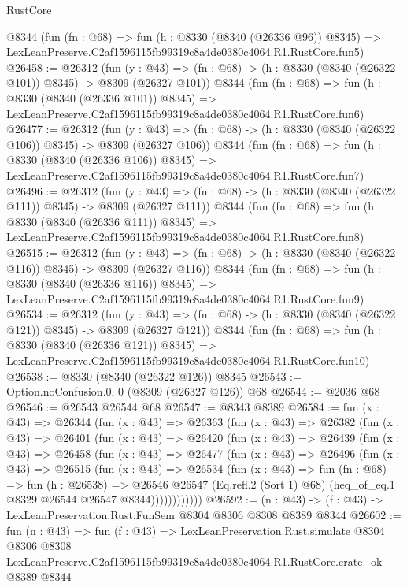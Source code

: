 \begin{lexlean}{RustCore}
\begin{coremodule}
    @8344
    (fun (fn : @68) =>
    fun (h : @8330 (@8340 (@26336 @96)) @8345) =>
    LexLeanPreserve.C2af1596115fb99319c8a4de0380c4064.R1.RustCore.fun5)
@26458 := @26312
    (fun (y : @43) => (fn : @68) -> (h : @8330 (@8340 (@26322 @101)) @8345) -> @8309 (@26327 @101))
    @8344
    (fun (fn : @68) =>
    fun (h : @8330 (@8340 (@26336 @101)) @8345) =>
    LexLeanPreserve.C2af1596115fb99319c8a4de0380c4064.R1.RustCore.fun6)
@26477 := @26312
    (fun (y : @43) => (fn : @68) -> (h : @8330 (@8340 (@26322 @106)) @8345) -> @8309 (@26327 @106))
    @8344
    (fun (fn : @68) =>
    fun (h : @8330 (@8340 (@26336 @106)) @8345) =>
    LexLeanPreserve.C2af1596115fb99319c8a4de0380c4064.R1.RustCore.fun7)
@26496 := @26312
    (fun (y : @43) => (fn : @68) -> (h : @8330 (@8340 (@26322 @111)) @8345) -> @8309 (@26327 @111))
    @8344
    (fun (fn : @68) =>
    fun (h : @8330 (@8340 (@26336 @111)) @8345) =>
    LexLeanPreserve.C2af1596115fb99319c8a4de0380c4064.R1.RustCore.fun8)
@26515 := @26312
    (fun (y : @43) => (fn : @68) -> (h : @8330 (@8340 (@26322 @116)) @8345) -> @8309 (@26327 @116))
    @8344
    (fun (fn : @68) =>
    fun (h : @8330 (@8340 (@26336 @116)) @8345) =>
    LexLeanPreserve.C2af1596115fb99319c8a4de0380c4064.R1.RustCore.fun9)
@26534 := @26312
    (fun (y : @43) => (fn : @68) -> (h : @8330 (@8340 (@26322 @121)) @8345) -> @8309 (@26327 @121))
    @8344
    (fun (fn : @68) =>
    fun (h : @8330 (@8340 (@26336 @121)) @8345) =>
    LexLeanPreserve.C2af1596115fb99319c8a4de0380c4064.R1.RustCore.fun10)
@26538 := @8330 (@8340 (@26322 @126)) @8345
@26543 := Option.noConfusion.{0, 0} (@8309 (@26327 @126)) @68
@26544 := @2036 @68
@26546 := @26543 @26544 @68
@26547 := @8343 @8389
@26584 := fun (x : @43) =>
  @26344
    (fun (x : @43) =>
    @26363
      (fun (x : @43) =>
      @26382
        (fun (x : @43) =>
        @26401
          (fun (x : @43) =>
          @26420
            (fun (x : @43) =>
            @26439
              (fun (x : @43) =>
              @26458
                (fun (x : @43) =>
                @26477
                  (fun (x : @43) =>
                  @26496
                    (fun (x : @43) =>
                    @26515
                      (fun (x : @43) =>
                      @26534
                        (fun (x : @43) =>
                        fun (fn : @68) =>
                        fun (h : @26538) =>
                        @26546
                          @26547
                          (Eq.refl.{2} (Sort 1) @68)
                          (heq_of_eq.{1} @8329 @26544 @26547 @8344))))))))))))
@26592 := (n : @43) -> (f : @43) -> LexLeanPreservation.Rust.FunSem @8304 @8306 @8308 @8389 @8344
@26602 := fun (n : @43) =>
  fun (f : @43) =>
  LexLeanPreservation.Rust.simulate
    @8304
    @8306
    @8308
    LexLeanPreserve.C2af1596115fb99319c8a4de0380c4064.R1.RustCore.crate_ok
    @8389
    @8344
\end{coremodule}
\end{lexlean}
